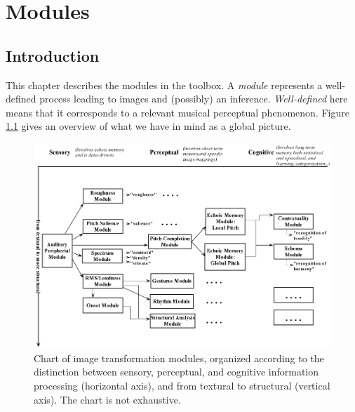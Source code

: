 
\chapter{Modules}

\section{Introduction}

This chapter describes the modules in the toolbox. A \emph{module}
represents a well-defined process leading to images and (possibly)
an inference. \emph{Well-defined} here means that it corresponds
to a relevant musical perceptual phenomenon. Figure
\ref{Fig:ImageTransformationModules} gives an overview of what we
have in mind as a global picture.

\begin{figure}[h]
    \centering
    \includegraphics[width=\textwidth]{Graphics/ImageTransformationModules}
    \caption{Chart of image transformation modules, organized
    according to the distinction between sensory, perceptual, and
    cognitive information processing (horizontal axis), and from
    textural to structural (vertical axis). The chart is not
    exhaustive.}
    \label{Fig:ImageTransformationModules}
\end{figure}

